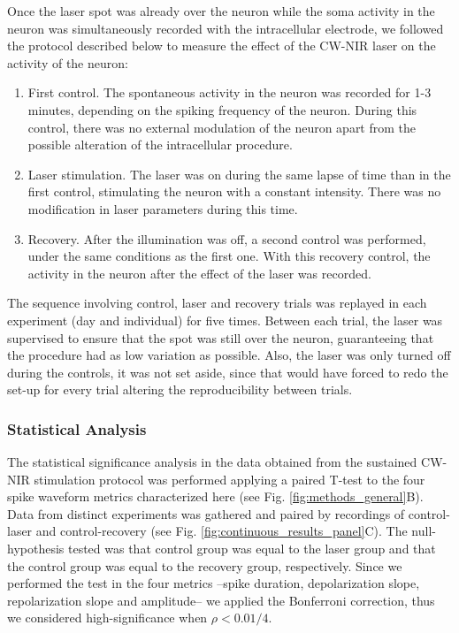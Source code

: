 Once the laser spot was already over the neuron while the soma activity in the neuron was simultaneously recorded with the intracellular electrode, we followed the protocol described below to measure the effect of the CW-NIR laser on the activity of the neuron:

\begin{enumerate}
    \item First control. The spontaneous activity in the neuron was recorded for 1-3 minutes, depending on the spiking frequency of the neuron. During this control, there was no external modulation of the neuron apart from the possible alteration of the intracellular procedure.  
    \item Laser stimulation. The laser was on during the same lapse of time than in the first control, stimulating the neuron with a constant intensity. There was no modification in laser parameters during this time.
    \item Recovery. After the illumination was off, a second control was performed, under the same conditions as the first one. With this recovery control, the activity in the neuron after the effect of the laser was recorded.
\end{enumerate}

The sequence involving control, laser and recovery trials was replayed in each experiment (day and individual) for five times. Between each trial, the laser was supervised to ensure that the spot was still over the neuron, guaranteeing that the procedure had as low variation as possible. Also, the laser was only turned off during the controls, it was not set aside, since that would have forced to redo the set-up for every trial altering the reproducibility between trials. 

\subsubsection{Statistical Analysis}
\label{sect:statistical_analysis}
The statistical significance analysis in the data obtained from the sustained CW-NIR stimulation protocol was performed applying a paired T-test to the four spike waveform metrics characterized here (see Fig. \ref{fig:methods_general}B). Data from distinct experiments was gathered and paired by recordings of control-laser and control-recovery (see Fig. \ref{fig:continuous_results_panel}C). The null-hypothesis tested was that control group was equal to the laser group and that the control group was equal to the recovery group, respectively. Since we performed the test in the four metrics --spike duration, depolarization slope, repolarization slope and amplitude-- we applied the Bonferroni correction, thus we considered high-significance when $\rho < 0.01/4$.



